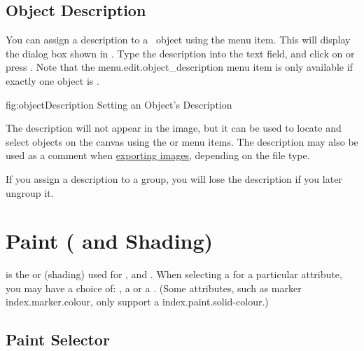 \section{Object Description}\label{sec:objectdescription}


You can assign a description to a \selected\ \gls*{object} using the
 menu item. This will display the
dialog box shown in . Type the
description into the text field, and click on  or press
.  Note that the \gls{menu.edit.object_description}
menu item is only available if exactly one object is \selected.

\FloatFig
  {fig:objectDescription}
  {}
  {Setting an Object's Description}

The description will not appear in the image, but it can be used to
locate and select \glspl*{object} on the canvas using the
 or
 menu items. The description
may also be used as a comment when
\hyperref[sec:exportimage]{exporting images}, depending on the
file type.

\begin{important}
If you assign a description to a \gls{group},
you will lose the description if you later ungroup it.
\end{important}

\chapter{Paint ( and Shading)}
\label{sec:paintcolourandshading}

 is the  or
 (shading) used for
,  and . When selecting a
 for a particular attribute, you may have a choice of:
, a  or a .
(Some attributes, such as marker \gls{index.marker.colour},
only support a \gls{index.paint.solid-colour}.)

\section{Paint Selector}\label{sec:paint}


